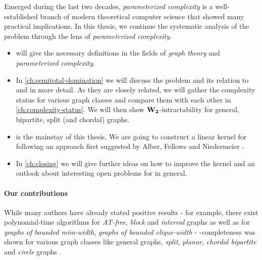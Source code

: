 Emerged during the last two decades, \textit{parameterized complexity} is a well-established branch of modern theoretical computer science that showed many practical implications. 
In this thesis, we continue the systematic analysis of the \sdom problem through the lens of \textit{parameterized complexity}. 

\begin{itemize}
    \item {} will give the necessary definitions in the fields of \textit{graph theory} and \textit{parameterized complexity}.
    \item In \cref{ch:semitotal-domination} we will discuss the \sdom problem and its relation to \dom and \tdom in more detail. 
    As they are closely related, we will gather the complexity status for various graph classes and compare them with each other in \cref{ch:complexity-status}. We will then show $\mathbf{W_2}$-intractability for general, bipartite, split (and chordal) graphs.
    \item {} is the mainstay of this thesis. 
    We are going to construct a linear kernel for \psdom following an approach first suggested by Alber, Fellows and Niedermeier \cite{Alber2004}. 
    \item In \cref{ch:closing} we will give further ideas on how to improve the kernel and an outlook about interesting open problems for \sdom in general.
\end{itemize}

\paragraph{Our contributions}

While many authors have already stated positive results - for example, there exist polynomial-time algorithms for \emph{AT-free}, \emph{block} and \emph{interval} graphs as well as for \emph{graphs of bounded mim-width}, \emph{graphs of bounded clique-width} \cite{Kloks2021, Galby2020,Courcelle1990,Henning2022,Henning2019} - \NP-completeness was shown for various graph classes like general graphs, \emph{split}, \emph{planar}, \emph{chordal bipartite} and \emph{circle} graphs \cite{Henning2019, Kloks2021}.


